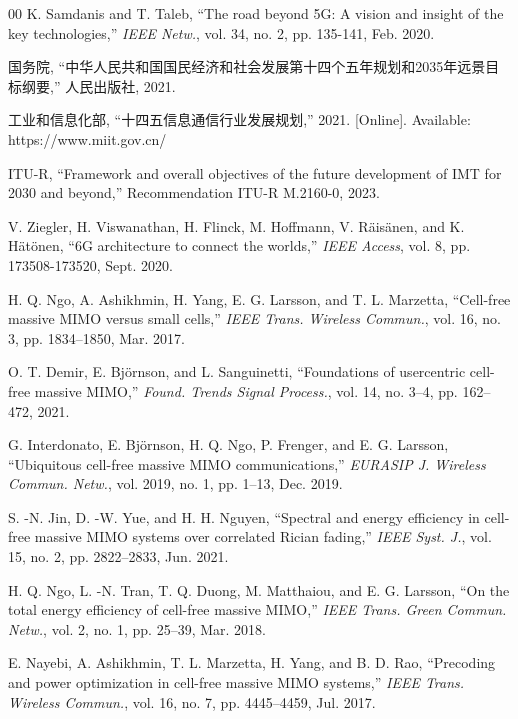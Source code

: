 \begin{thebibliography}{00}
K. Samdanis and T. Taleb, ``The road beyond 5G: A vision and insight of the key technologies,'' \textit{IEEE Netw.}, vol. 34, no. 2, pp. 135-141, Feb. 2020.

国务院, ``中华人民共和国国民经济和社会发展第十四个五年规划和2035年远景目标纲要,'' 人民出版社, 2021.

工业和信息化部, ``十四五信息通信行业发展规划,'' 2021. [Online]. Available: https://www.miit.gov.cn/

ITU-R, ``Framework and overall objectives of the future development of IMT for 2030 and beyond,'' Recommendation ITU-R M.2160-0, 2023.

V. Ziegler, H. Viswanathan, H. Flinck, M. Hoffmann, V. R{\"a}is{\"a}nen, and K. H{\"a}t{\"o}nen, ``6G architecture to connect the worlds,'' \textit{IEEE Access}, vol. 8, pp. 173508-173520, Sept. 2020.

H. Q. Ngo, A. Ashikhmin, H. Yang, E. G. Larsson, and T. L. Marzetta, ``Cell-free massive MIMO versus small cells,'' \textit{IEEE Trans. Wireless Commun.}, vol. 16, no. 3, pp. 1834--1850, Mar. 2017.

O. T. Demir, E. Bj{\"o}rnson, and L. Sanguinetti, ``Foundations of usercentric cell-free massive MIMO,'' \textit{Found. Trends Signal Process.}, vol. 14, no. 3--4, pp. 162--472, 2021.

G. Interdonato, E. Bj{\"o}rnson, H. Q. Ngo, P. Frenger, and E. G. Larsson, ``Ubiquitous cell-free massive MIMO communications,'' \textit{EURASIP J. Wireless Commun. Netw.}, vol. 2019, no. 1, pp. 1--13, Dec. 2019.

S. -N. Jin, D. -W. Yue, and H. H. Nguyen, ``Spectral and energy efficiency in cell-free massive MIMO systems over correlated Rician fading,'' \textit{IEEE Syst. J.}, vol. 15, no. 2, pp. 2822--2833, Jun. 2021.

H. Q. Ngo, L. -N. Tran, T. Q. Duong, M. Matthaiou, and E. G. Larsson, ``On the total energy efficiency of cell-free massive MIMO,'' \textit{IEEE Trans. Green Commun. Netw.}, vol. 2, no. 1, pp. 25--39, Mar. 2018.

E. Nayebi, A. Ashikhmin, T. L. Marzetta, H. Yang, and B. D. Rao, ``Precoding and power optimization in cell-free massive MIMO systems,'' \textit{IEEE Trans. Wireless Commun.}, vol. 16, no. 7, pp. 4445--4459, Jul. 2017.


\end{thebibliography}

